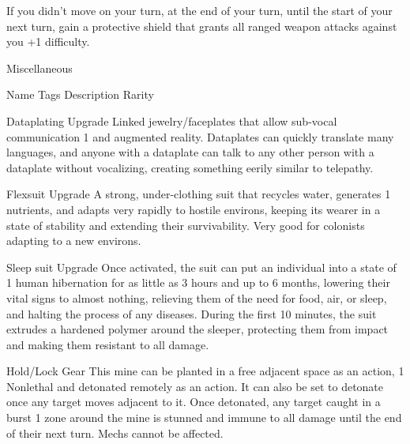 If you didn’t move on your turn, at the end of your turn, until the start of your next turn, gain a protective  
shield that grants all ranged weapon attacks against you +1 difficulty.
 

                                                   Miscellaneous  

  Name                Tags         Description                                                               Rarity 

 Dataplating          Upgrade      Linked jewelry/faceplates that allow sub-vocal communication               1 
                                   and augmented reality. Dataplates can quickly translate many  
                                   languages, and anyone with a dataplate can talk to any other  
                                   person with a dataplate without vocalizing, creating something  
                                   eerily similar to telepathy. 

 Flexsuit             Upgrade      A strong, under-clothing suit that recycles water, generates               1 
                                   nutrients, and adapts very rapidly to hostile environs, keeping its  
                                   wearer in a state of stability and extending their survivability. Very  
                                   good for colonists adapting to a new environs. 

 Sleep suit           Upgrade      Once activated, the suit can put an individual into a state of             1 
                                   human hibernation for as little as 3 hours and up to 6 months,  
                                   lowering their vital signs to almost nothing, relieving them of the  
                                   need for food, air, or sleep, and halting the process of any  
                                   diseases. During the first 10 minutes, the suit extrudes a  
                                   hardened polymer around the sleeper, protecting them from  
                                   impact and making them resistant to all damage. 

                                                                                                                   


 Hold/Lock          Gear        This mine can be planted in a free adjacent space as an action,      1 
 Nonlethal                      and detonated remotely as an action. It can also be set to  
                                detonate once any target moves adjacent to it. Once detonated,  
                                any target caught in a burst 1 zone around the mine is stunned  
                                and immune to all damage until the end of their next turn. Mechs  
                                cannot be affected. 

